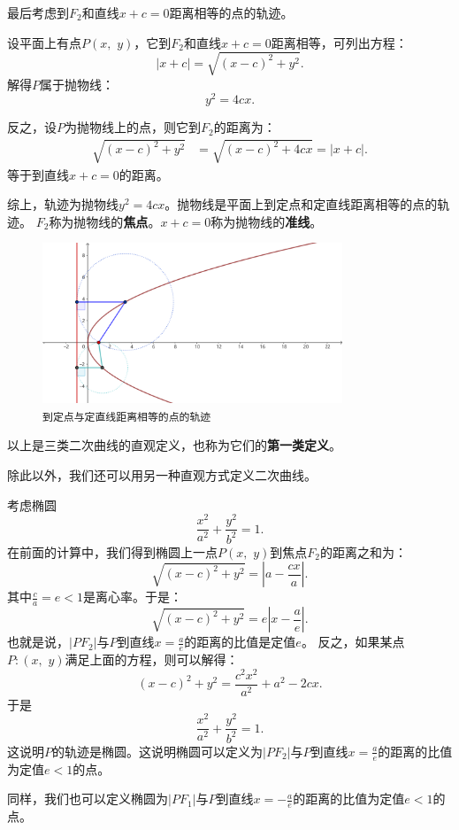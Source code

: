 \documentclass[12pt,UTF8]{ctexbook}
\theoremstyle{definition}
\theoremstyle{plain}
\begin{document}
最后考虑到$F_2$和直线$x + c = 0$距离相等的点的轨迹。

设平面上有点$P(x, \,\,y)$，它到$F_2$和直线$x + c = 0$距离相等，可列出方程：
$$ \left|x + c\right| = \sqrt{(x - c)^2 + y^2}.$$
解得$P$属于抛物线：
$$ y^2 = 4cx.$$

反之，设$P$为抛物线上的点，则它到$F_2$的距离为：
\begin{align*}
    \sqrt{(x - c)^2 + y^2} &= \sqrt{(x - c)^2 + 4cx} = |x + c|.
\end{align*}
等于到直线$x + c = 0$的距离。

综上，轨迹为抛物线$ y^2 = 4cx$。抛物线是平面上到定点和定直线距离相等的点的轨迹。
$F_2$称为抛物线的\textbf{焦点}。$x + c = 0$称为抛物线的\textbf{准线}。

\begin{figure}[h] 
    \centering
    \includegraphics[width=0.8\textwidth]{tu/抛物线第一定义.png}
    \caption*{\texttt{到定点与定直线距离相等的点的轨迹}}
\end{figure}

以上是三类二次曲线的直观定义，也称为它们的\textbf{第一类定义}。

除此以外，我们还可以用另一种直观方式定义二次曲线。

考虑椭圆
$$ \frac{x^2}{a^2} + \frac{y^2}{b^2} = 1.$$
在前面的计算中，我们得到椭圆上一点$P(x,\,\,y)$到焦点$F_2$的距离之和为：
$$ \sqrt{(x - c)^2 + y^2} = \left|a - \frac{cx}{a}\right|.$$
其中$\frac{c}{a} = e < 1$是离心率。于是：
$$  \sqrt{(x - c)^2 + y^2} = e\left|x - \frac{a}{e}\right| . $$
也就是说，$|PF_2|$与$P$到直线$x = \frac{a}{e}$的距离的比值是定值$e$。
反之，如果某点$P:(x,\,\,y)$满足上面的方程，则可以解得：
$$ (x - c)^2 + y^2 = \frac{c^2x^2}{a^2} + a^2 -2cx.$$
于是
$$ \frac{x^2}{a^2} + \frac{y^2}{b^2} = 1.$$
这说明$P$的轨迹是椭圆。这说明椭圆可以定义为$|PF_2|$与$P$到直线$x = \frac{a}{e}$的距离的比值为定值$e<1$的点。

同样，我们也可以定义椭圆为$|PF_1|$与$P$到直线$x = -\frac{a}{e}$的距离的比值为定值$e<1$的点。
\end{document}
